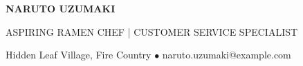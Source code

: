 \documentclass[10pt,a4paper]{article}
\begin{document}

\begin{center}

{\fontsize{32}{36}\selectfont
\bfseries\color{navy} NARUTO UZUMAKI}

\vspace{4pt}

{\large\color{orange}
ASPIRING RAMEN CHEF
\quad | \quad
CUSTOMER SERVICE SPECIALIST}

\vspace{6pt}

{\small
Hidden Leaf Village, Fire Country
\quad $\bullet$ \quad
naruto.uzumaki@example.com
}

\end{center}

\vspace{8pt}


\end{document}

